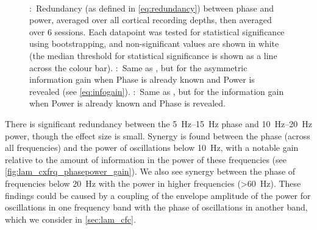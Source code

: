 \begin{figure}[tbp]
    \centering
    \\
    \hspace*{\fill}\hspace{.4cm}\hspace*{\fill}
    \hspace*{\fill}
    \caption{
\protect{}:~Redundancy (as defined in \autoref{eq:redundancy}) between phase and power, averaged over all cortical recording depths, then averaged over \num{6} sessions.
Each datapoint was tested for statistical significance using bootstrapping, and non-significant values are shown in white (the median threshold for statistical significance is shown as a line across the colour bar).
\protect{}:~Same as \protect{}, but for the asymmetric information gain when Phase is already known and Power is revealed (see \autoref{eq:infogain}).
\protect{}:~Same as \protect{}, but for the information gain when Power is already known and Phase is revealed.
}
\label{fig:lam_cxfrq_powerphase_info}
\end{figure}

There is significant redundancy between the \SIrange{5}{15}{Hz} phase and \SIrange{10}{20}{Hz} power, though the effect size is small.
Synergy is found between the phase (across all frequencies) and the power of oscillations below \SI{10}{Hz}, with a notable gain relative to the amount of information in the power of these frequencies (see \autoref{fig:lam_cxfrq_phasepower_gain}).
We also see synergy between the phase of frequencies below \SI{20}{Hz} with the power in higher frequencies (\SI{>60}{Hz}).
These findings could be caused by a coupling of the envelope amplitude of the power for oscillations in one frequency band with the phase of oscillations in another band, which we consider in \autoref{sec:lam_cfc}.

